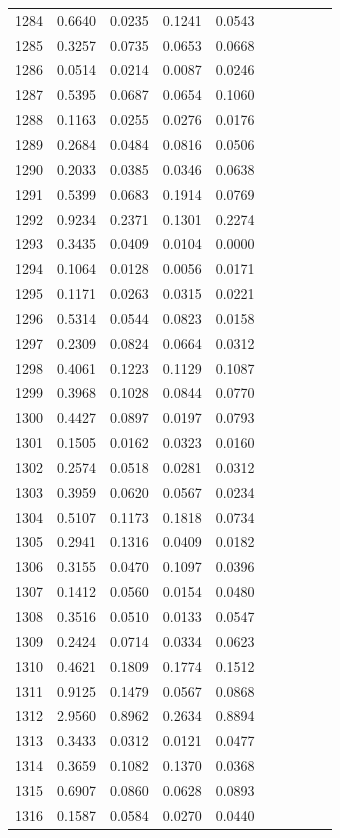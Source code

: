 \begin{table}
\begin{tabular}{cccccccccc}
1284& 0.6640& 0.0235& 0.1241& 0.0543\\ 
1285& 0.3257& 0.0735& 0.0653& 0.0668\\ 
1286& 0.0514& 0.0214& 0.0087& 0.0246\\ 
1287& 0.5395& 0.0687& 0.0654& 0.1060\\ 
1288& 0.1163& 0.0255& 0.0276& 0.0176\\ 
1289& 0.2684& 0.0484& 0.0816& 0.0506\\ 
1290& 0.2033& 0.0385& 0.0346& 0.0638\\ 
1291& 0.5399& 0.0683& 0.1914& 0.0769\\ 
1292& 0.9234& 0.2371& 0.1301& 0.2274\\ 
1293& 0.3435& 0.0409& 0.0104& 0.0000\\ 
1294& 0.1064& 0.0128& 0.0056& 0.0171\\ 
1295& 0.1171& 0.0263& 0.0315& 0.0221\\ 
1296& 0.5314& 0.0544& 0.0823& 0.0158\\ 
1297& 0.2309& 0.0824& 0.0664& 0.0312\\ 
1298& 0.4061& 0.1223& 0.1129& 0.1087\\ 
1299& 0.3968& 0.1028& 0.0844& 0.0770\\ 
1300& 0.4427& 0.0897& 0.0197& 0.0793\\ 
1301& 0.1505& 0.0162& 0.0323& 0.0160\\ 
1302& 0.2574& 0.0518& 0.0281& 0.0312\\ 
1303& 0.3959& 0.0620& 0.0567& 0.0234\\ 
1304& 0.5107& 0.1173& 0.1818& 0.0734\\ 
1305& 0.2941& 0.1316& 0.0409& 0.0182\\ 
1306& 0.3155& 0.0470& 0.1097& 0.0396\\ 
1307& 0.1412& 0.0560& 0.0154& 0.0480\\ 
1308& 0.3516& 0.0510& 0.0133& 0.0547\\ 
1309& 0.2424& 0.0714& 0.0334& 0.0623\\ 
1310& 0.4621& 0.1809& 0.1774& 0.1512\\ 
1311& 0.9125& 0.1479& 0.0567& 0.0868\\ 
1312& 2.9560& 0.8962& 0.2634& 0.8894\\ 
1313& 0.3433& 0.0312& 0.0121& 0.0477\\ 
1314& 0.3659& 0.1082& 0.1370& 0.0368\\ 
1315& 0.6907& 0.0860& 0.0628& 0.0893\\ 
1316& 0.1587& 0.0584& 0.0270& 0.0440\\ 

\end{tabular}
\end{table}
